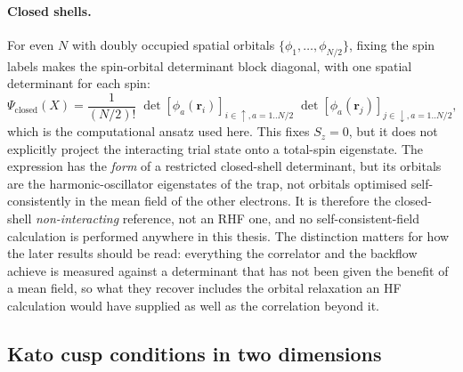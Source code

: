 \paragraph{Closed shells.}
For even $N$ with doubly occupied spatial orbitals
$\{\phi_1,\ldots,\phi_{N/2}\}$, fixing the spin labels makes the spin-orbital determinant
block diagonal, with one spatial determinant for each spin:
\[
\Psi_{\mathrm{closed}}(X)
=\frac{1}{(N/2)!}\;
\det[\phi_a(\mathbf r_i)]_{i\in\uparrow,a=1..N/2}\;
\det[\phi_a(\mathbf r_j)]_{j\in\downarrow,a=1..N/2},
\]
which is the computational ansatz used here. This fixes $S_z=0$, but it does not explicitly
project the interacting trial state onto a total-spin eigenstate. The expression has the
\emph{form} of a restricted closed-shell determinant, but
its orbitals are the
harmonic-oscillator eigenstates of the trap, not orbitals optimised self-consistently in
the mean field of the other electrons. It is therefore the closed-shell
\emph{non-interacting} reference, not an RHF one, and no self-consistent-field calculation
is performed anywhere in this thesis. The distinction matters for how the later results
should be read: everything the correlator and the backflow achieve is measured against a
determinant that has not been given the benefit of a mean field, so what they recover
includes the orbital relaxation an HF calculation would have supplied as well as the
correlation beyond it.


\subsection{Kato cusp conditions in two dimensions}
\label{subsec:cusp}


